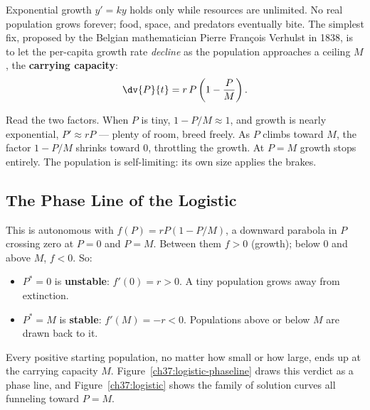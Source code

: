 Exponential growth $y'=ky$ holds only while resources are unlimited. No real
population grows forever; food, space, and predators eventually bite. The simplest
fix, proposed by the Belgian mathematician Pierre Fran\c{c}ois Verhulst in 1838, is
to let the per-capita growth rate \emph{decline} as the population approaches a
ceiling $M$, the \textbf{carrying capacity}:
\[
  \dv{P}{t} = r\,P\left(1 - \frac{P}{M}\right).
\]

\begin{intuitionbox}
Read the two factors. When $P$ is tiny, $1-P/M\approx 1$, and growth is nearly
exponential, $P'\approx rP$ --- plenty of room, breed freely. As $P$ climbs toward
$M$, the factor $1-P/M$ shrinks toward $0$, throttling the growth. At $P=M$ growth
stops entirely. The population is self-limiting: its own size applies the brakes.
\end{intuitionbox}

\subsection{The Phase Line of the Logistic}

This is autonomous with $f(P)=rP(1-P/M)$, a downward parabola in $P$ crossing zero
at $P=0$ and $P=M$. Between them $f>0$ (growth); below $0$ and above $M$, $f<0$. So:
\begin{itemize}
\item $P^*=0$ is \textbf{unstable}: $f'(0)=r>0$. A tiny population grows away from
extinction.
\item $P^*=M$ is \textbf{stable}: $f'(M)=-r<0$. Populations above or below $M$ are
drawn back to it.
\end{itemize}
Every positive starting population, no matter how small or how large, ends up at the
carrying capacity $M$. Figure~\ref{ch37:logistic-phaseline} draws this verdict as a
phase line, and Figure~\ref{ch37:logistic} shows the family of solution curves all
funneling toward $P=M$.

